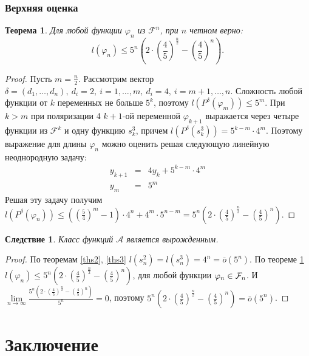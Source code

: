 \documentclass[bibliography=totoc, a4paper, 14pt]{extarticle}
\let\stdsection\section
\renewcommand\section{\newpage\stdsection}
\newtheorem{myth}{Теорема}
\newtheorem*{myco}{Следствие}
\newcommand{\pphi}[1] {P^{\delta}(\varphi_{#1})}
\def\in{\mathchar"3232\nobreak\discretionary{}{\usefont{OMS}{cmsy}{m}{n}\char50}{}}
\begin{document}
\subsubsection{Верхняя оценка}

\begin{myth}
\label{thh}
Для любой функции $\varphi_n$ из $\mathcal{F}^n$, при $n$ четном верно:
$$ l(\varphi_n) \leqslant 5^n\left(2\cdot\left(\frac{4}{5}\right)^{\frac{n}{2}} -
\left( \frac{4}{5} \right)^n\right).$$
\end{myth}
\begin{proof}
Пусть $m = \frac{n}{2}$.
Рассмотрим вектор $\delta=(d_1,\dots,d_n),\ d_i = 2,\ i=1,\dots,m,\ d_i=4,
{\ i=m+1,\dots,n}$. Сложность любой функции от $k$ переменных не больше $5^k$, поэтому
$l(\pphi{m}) \leqslant 5^m$. При $k > m$ при поляризации 4 $k+1$-ой переменной
$\varphi_{k+1}$ выражается через четыре функции из $\mathcal{F}^k$ и одну функцию $s^3_k$, причем
$l(P^{\delta}(s^3_k)) = 5^{k-m} \cdot 4^m$. Поэтому выражение для длины
$\varphi_n$ можно оценить решая следующую линейную неоднородную задачу:
$$ \begin{array}{lcl}
y_{k+1} &=& 4 y_k + 5^{k-m}\cdot 4^m \\
y_m     &=& 5^m
\end{array} $$
Решая эту задачу получим $l(\pphi{n}) \leqslant \left(\left(\frac{5}{4}\right)^m - 1 \right)\cdot
4^n+4^m\cdot 5^{n-m} = 5^n\left(2\cdot\left(\frac{4}{5}\right)^{\frac{n}{2}} -
\left( \frac{4}{5} \right)^n\right)$.
\end{proof}

\begin{myco}
Класс функций $\mathcal{A}$ является вырожденным.
\end{myco}
\begin{proof}
По теоремам \ref{ths2}, \ref{ths3} $l(s^2_n)=l(s^3_n)=4^n=\bar{o}(5^n)$. По теореме \ref{thh}
${l(\varphi_n) \leqslant 5^n\left(2\cdot\left(\frac{4}{5}\right)^{\frac{n}{2}} -
\left( \frac{4}{5} \right)^n\right)}$, для
любой функции $\varphi_n \in \mathcal{F}_n$. И $\lim\limits_{n \rightarrow \infty} \frac{5^n\left
(2\cdot\left(\frac{4}{5}\right)^{\frac{n}{2}} - \left( \frac{4}{5} \right)^n\right)}{5^n} = 0$,
поэтому $5^n\left(2\cdot\left(\frac{4}{5}\right)^{\frac{n}{2}} -\left( \frac{4}{5} \right)^n\right)
= \bar{o}(5^n)$.
\end{proof}

\newpage
\section{Заключение}
\end{document}
